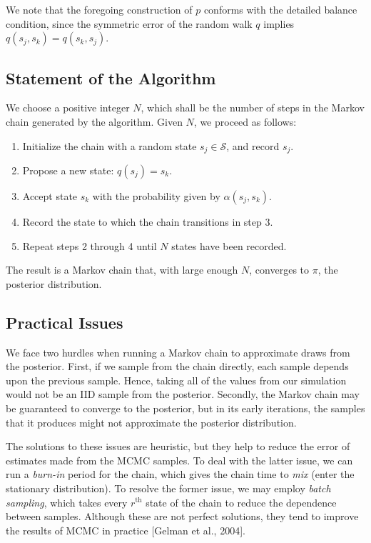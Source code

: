 \documentclass[12pt,twoside]{reedthesis}
\begin{document}
			We note that the foregoing construction of $p$ conforms with the detailed balance condition, since the symmetric error of the random walk $q$ implies $q(s_j,s_k) = q(s_k,s_j)$.
	
		\subsection*{Statement of the Algorithm}
			We choose a positive integer $N$, 
			which shall be the number of steps in the Markov chain generated by the algorithm.
			Given $N$, we proceed as follows:
			\begin{enumerate}
				\item Initialize the chain with a random state $s_j \in \mathcal S$, and record $s_j$.
				\item Propose a new state: $q(s_j) = s_k$.
				\item Accept state $s_k$ with the probability given by $\alpha(s_j,s_k)$. 
				\item Record the state to which the chain transitions in step 3.
				\item Repeat steps 2 through 4 until $N$ states have been recorded.
			\end{enumerate}
			The result is a Markov chain that, with large enough $N$, 
			converges to $\pi$, the posterior distribution.
		\subsection*{Practical Issues}
			We face two hurdles when running a Markov chain to approximate draws from the posterior. 
			First, if we sample from the chain directly, each sample depends upon the previous sample. 
			Hence, taking all of the values from our simulation would not be an IID sample from the posterior. 
			Secondly, the Markov chain may be guaranteed to converge to the posterior, but in its early iterations, the samples that it produces might not approximate the posterior distribution. 
			
			The solutions to these issues are heuristic, but they help to reduce the error of estimates made from the MCMC samples. 
			To deal with the latter issue, we can run a {\em burn-in} period for the chain, which gives the chain time to {\em mix} (enter the stationary distribution). 
			To resolve the former issue, we may employ {\em batch sampling}, which takes every $r^{\text{th}}$ state of the chain to reduce the dependence between samples.
			Although these are not perfect solutions, they tend to improve the results of MCMC in practice [Gelman et al., 2004].
			
\end{document}

